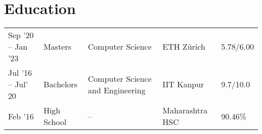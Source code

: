 %

\section*{Education}
\begin{tabulary}{\textwidth}{L L L L L}

\toprule
{} &  &  &  & \\
\midrule
Sep '20 -- Jan '23 & Masters & Computer Science & ETH Zürich & 5.78/6.00\\%
Jul '16 -- Jul' 20 & Bachelors & Computer Science and Engineering & IIT Kanpur & 9.7/10.0\\%
Feb '16 & High School & -- & Maharashtra HSC & 90.46\%\\%
\bottomrule

\end{tabulary}
